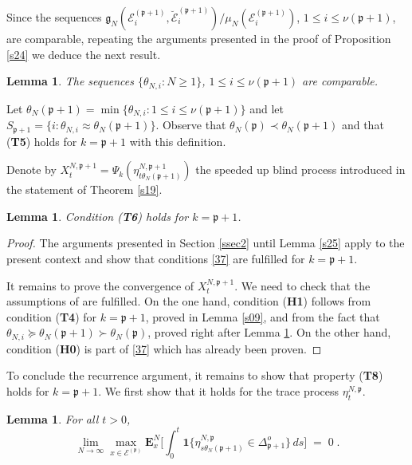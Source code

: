 \documentclass[reqno]{amsart}
\newtheorem{lemma}[theorem]{Lemma}
\begin{document}
Since the sequences ${{\mathfrak g}}_N ({{\mathcal E}}^{({{\mathfrak p}} +1)}_i , \breve{{{\mathcal E}}}^{({{\mathfrak p}} +1)}_i)/\mu_N({{\mathcal E}}^{({{\mathfrak p}} +1)}_i)$, $1\le i \le \nu({{\mathfrak p}}+1)$, are comparable, repeating the arguments presented in the proof
of Proposition \ref{s24} we deduce the next result.

\begin{lemma}
\label{s28}
The sequences $\{\theta_{N,i} : N\ge 1\}$, $1\le i \le \nu({{\mathfrak p}}+1)$
are comparable.
\end{lemma}

Let $\theta_N({{\mathfrak p}} +1) = \min \{\theta_{N,i} : 1\le i\le \nu({{\mathfrak p}}+1)\}$ and let $S_{{{\mathfrak p}}+1} = \{i : \theta_{N,i} \approx \theta_N({{\mathfrak p}} +1)\}$. Observe that $\theta_N({{\mathfrak p}}) \prec \theta_N({{\mathfrak p}} +1)$ and
that ({\bf T5}) holds for $k={{\mathfrak p}}+1$ with this definition.  \medskip

Denote by $X^{N,{{\mathfrak p}}+1}_t = \Psi_k(\eta^{N, {{\mathfrak p}}+1}_{t\theta_N({{\mathfrak p}}
  +1)})$ the speeded up blind process introduced in the statement of
Theorem \ref{s19}.  

\begin{lemma}
\label{s35}
Condition {\rm({\bf T6})} holds for $k={{\mathfrak p}}+1$.
\end{lemma}

\begin{proof}
The arguments presented in Section \ref{ssec2} until Lemma \ref{s25}
apply to the present context and show that conditions \eqref{37} are
fulfilled for $k={{\mathfrak p}}+1$.

It remains to prove the convergence of $X^{N,{{\mathfrak p}}+1}_t$. We need to
check that the assumptions of \cite[Theorem 2.7]{bl2} are
fulfilled. On the one hand, condition ({\bf H1}) follows from
condition ({\bf T4}) for $k={{\mathfrak p}}+1$, proved in Lemma \ref{s09}, and
from the fact that $\theta_{N,i} \succeq \theta_N({{\mathfrak p}}+1) \succ
\theta_N({{\mathfrak p}})$, proved right after Lemma \ref{s28}.  On the other
hand, condition ({\bf H0}) is part of \eqref{37} which has already
been proven.
\end{proof}

To conclude the recurrence argument, it remains to show that property
({\bf T8}) holds for $k={{\mathfrak p}}+1$. We first show that it holds for the
trace process $\eta^{N,{{\mathfrak p}}}_t$.

\begin{lemma}
\label{s10}
For all $t>0$,
\begin{equation*}
\lim_{N\to \infty} \max_{x\in {{\mathcal E}}^{({{\mathfrak p}})}} {{\mathbf E}}^N_x \Big[ \int_0^t 
{{\mathbf 1}}\{ \eta^{N,{{\mathfrak p}}}_{s \theta_N({{\mathfrak p}}+1)} \in \Delta^o_{{{\mathfrak p}} +1} \} 
\, ds \Big]\;=\; 0\;.
\end{equation*}
\end{lemma}
\end{document}
